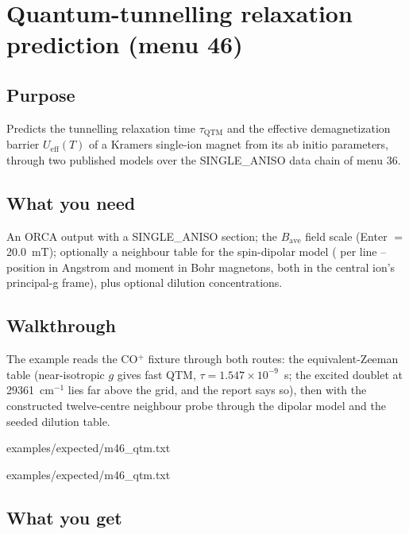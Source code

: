 \chapter{Quantum-tunnelling relaxation prediction (menu 46)}
\label{ch:menu46}

\section{Purpose}

Predicts the tunnelling relaxation time $\tau_{\mathrm{QTM}}$ and the
effective demagnetization barrier $U_{\mathrm{eff}}(T)$ of a Kramers
single-ion magnet from its ab initio parameters, through two published
models over the SINGLE\_ANISO data chain of menu 36.

\section{What you need}

An ORCA output with a SINGLE\_ANISO section; the $B_{\mathrm{ave}}$ field
scale (Enter $=$ 20.0~mT); optionally a neighbour table for the
spin-dipolar model ( per line -- position in
Angstrom and moment in Bohr magnetons, both in the central ion's
principal-g frame), plus optional dilution concentrations.

\section{Walkthrough}

The example reads the CO$^{+}$ fixture through both routes: the
equivalent-Zeeman table (near-isotropic $g$ gives fast QTM,
$\tau = 1.547\times10^{-9}$~s; the excited doublet at
29361~cm$^{-1}$ lies far above the grid, and the report says so), then
with the constructed twelve-centre neighbour probe through the dipolar
model and the seeded dilution table.


  {examples/expected/m46_qtm.txt}


  {examples/expected/m46_qtm.txt}

\section{What you get}

